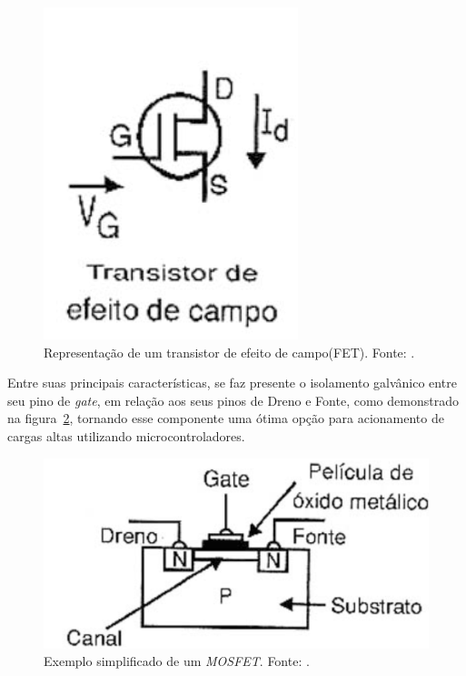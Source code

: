 \FloatBarrier
\begin{figure}[!htbp]
	\centering
	\includegraphics[scale=0.5]{imagens/MOSFET1}
	\caption{Representação de um transistor de efeito de campo(FET). Fonte: .}
	\label{fig:MOSFET1}
\end{figure}
\FloatBarrier

Entre suas principais características, se faz presente o isolamento galvânico entre seu pino de \textit{gate}, em relação aos seus pinos de Dreno e Fonte, como demonstrado na figura~\ref{fig:MOSFET2}, tornando esse componente uma ótima opção para acionamento de cargas altas utilizando microcontroladores.

\FloatBarrier
\begin{figure}[!htbp]
	\centering
	\includegraphics[scale=0.5]{imagens/MOSFET2}
	\caption{Exemplo simplificado de um \textit{MOSFET}. Fonte: .}
	\label{fig:MOSFET2}
\end{figure}
\FloatBarrier

